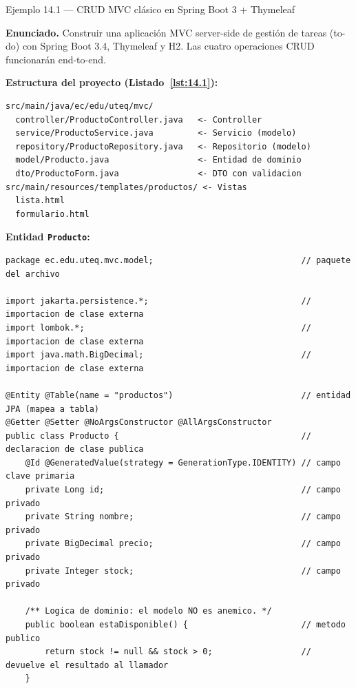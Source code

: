 \documentclass[11pt,a4paper,openany]{book}
\begin{document}
\begin{cajaejemplo}{Ejemplo 14.1 --- CRUD MVC clásico en Spring Boot 3 + Thymeleaf}


\textbf{Enunciado.} Construir una aplicación MVC server-side de gestión de tareas (to-do) con Spring Boot 3.4, Thymeleaf y H2. Las cuatro operaciones CRUD funcionarán end-to-end.

\textbf{Estructura del proyecto (Listado~\ref{lst:14.1}):}
\begin{lstlisting}[style=shell,numbers=none,caption={Ejemplo de Shell},label=lst:14.1]
src/main/java/ec/edu/uteq/mvc/
  controller/ProductoController.java   <- Controller
  service/ProductoService.java         <- Servicio (modelo)
  repository/ProductoRepository.java   <- Repositorio (modelo)
  model/Producto.java                  <- Entidad de dominio
  dto/ProductoForm.java                <- DTO con validacion
src/main/resources/templates/productos/ <- Vistas
  lista.html
  formulario.html
\end{lstlisting}

\textbf{Entidad \texttt{Producto}:}
\begin{lstlisting}[style=java,caption={Producto.java},label=lst:14.2]
package ec.edu.uteq.mvc.model;                              // paquete del archivo

import jakarta.persistence.*;                               // importacion de clase externa
import lombok.*;                                            // importacion de clase externa
import java.math.BigDecimal;                                // importacion de clase externa

@Entity @Table(name = "productos")                          // entidad JPA (mapea a tabla)
@Getter @Setter @NoArgsConstructor @AllArgsConstructor
public class Producto {                                     // declaracion de clase publica
    @Id @GeneratedValue(strategy = GenerationType.IDENTITY) // campo clave primaria
    private Long id;                                        // campo privado
    private String nombre;                                  // campo privado
    private BigDecimal precio;                              // campo privado
    private Integer stock;                                  // campo privado

    /** Logica de dominio: el modelo NO es anemico. */
    public boolean estaDisponible() {                       // metodo publico
        return stock != null && stock > 0;                  // devuelve el resultado al llamador
    }


\end{lstlisting}
\end{cajaejemplo}
\end{document}
